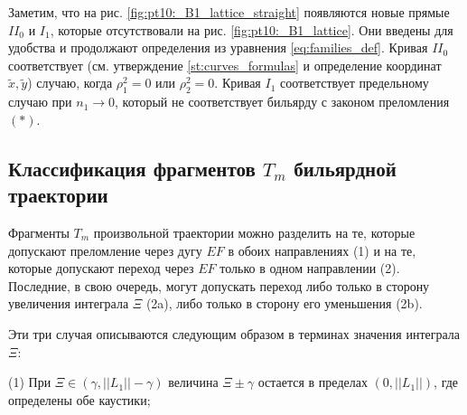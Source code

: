 
\begin{remark}
Заметим, что на рис. \ref{fig:pt10:_B1_lattice_straight} появляются новые прямые $II_0$ и $I_1$, которые отсутствовали на рис. \ref{fig:pt10:_B1_lattice}. Они введены для удобства и продолжают определения из уравнения \eqref{eq:families_def}. Кривая $II_0$ соответствует (см. утверждение \ref{st:curves_formulas} и определение координат $\widetilde{x}, \widetilde{y}$) случаю, когда $\rho_1^2 = 0$ или $\rho_2^2 = 0$. Кривая $I_1$ соответствует предельному случаю при $n_1 \to 0$, который не соответствует бильярду с законом преломления $(\ast)$.
\end{remark}

\subsection{Классификация фрагментов  $T_m$ бильярдной траектории}
Фрагменты  $T_m$ произвольной траектории можно разделить на те, которые допускают преломление через дугу $EF$ в обоих направлениях (1) и на те, которые допускают переход через $EF$ только в одном направлении  (2). Последние, в свою очередь, могут допускать переход либо только в сторону увеличения интеграла $\Xi$ (2a), либо только в сторону его уменьшения (2b).

Эти три случая описываются следующим образом в терминах значения интеграла $\Xi$:

(1) При $\Xi \in (\gamma, ||L_1|| - \gamma)$ величина $\Xi \pm \gamma$ остается в пределах $(0, ||L_1||)$, где определены обе каустики;

